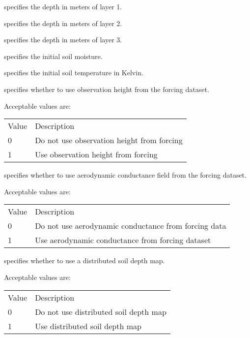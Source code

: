   specifies the depth in meters
 of layer 1.

  specifies the depth in meters
 of layer 2.

  specifies the depth in meters
 of layer 3.

  specifies the initial soil
 moisture.

  specifies the initial soil
 temperature in Kelvin.

  specifies whether
 to use observation height from the forcing dataset.

 Acceptable values are:

 \begin{tabular}{ll}
 Value & Description                                             \\
 0     & Do not use observation height from forcing              \\
 1     & Use observation height from forcing                     \\
 \end{tabular}

  specifies
 whether to use aerodynamic conductance field from the forcing
 dataset.

 Acceptable values are:

 \begin{tabular}{ll}
 Value & Description                                            \\
 0     & Do not use aerodynamic conductance from forcing data   \\
 1     & Use aerodynamic conductance from forcing dataset       \\
 \end{tabular}

  specifies
 whether to use a distributed soil depth map.

 Acceptable values are:

 \begin{tabular}{ll}
 Value & Description                           \\
 0     & Do not use distributed soil depth map \\
 1     & Use distributed soil depth map        \\
 \end{tabular}
 

